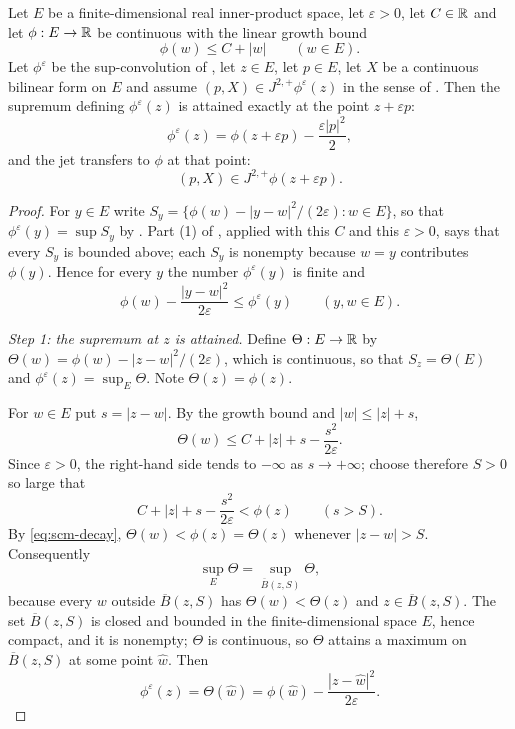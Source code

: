 \begin{lemma}
Let $E$ be a finite-dimensional real inner-product space, let $\varepsilon>0$,
let $C\in\mathbb{R}$ and let $\phi:E\to\mathbb{R}$ be continuous with the linear growth bound
\[
  \phi(w)\le C+|w|\qquad(w\in E).
\]
Let $\phi^\varepsilon$ be the sup-convolution of , let
$z\in E$, let $p\in E$, let $X$ be a continuous bilinear form on $E$ and assume
$(p,X)\in J^{2,+}\phi^\varepsilon(z)$ in the sense of . Then
the supremum defining $\phi^\varepsilon(z)$ is attained exactly at the point
$z+\varepsilon p$:
\[
  \phi^\varepsilon(z)=\phi(z+\varepsilon p)-\frac{\varepsilon|p|^2}{2},
\]
and the jet transfers to $\phi$ at that point:
\[
  (p,X)\in J^{2,+}\phi(z+\varepsilon p).
\]
\end{lemma}
\begin{proof}
For $y\in E$ write
$S_y=\{\phi(w)-|y-w|^2/(2\varepsilon):w\in E\}$, so that
$\phi^\varepsilon(y)=\sup S_y$ by . Part (1) of
, applied with this $C$ and this
$\varepsilon>0$, says that every $S_y$ is bounded above; each $S_y$ is nonempty
because $w=y$ contributes $\phi(y)$. Hence for every $y$ the number
$\phi^\varepsilon(y)$ is finite and
\begin{equation}\label{eq:scm-ub}
  \phi(w)-\frac{|y-w|^2}{2\varepsilon}\le\phi^\varepsilon(y)
  \qquad(y,w\in E).
\end{equation}

\emph{Step 1: the supremum at $z$ is attained.}
Define $\Theta:E\to\mathbb{R}$ by $\Theta(w)=\phi(w)-|z-w|^2/(2\varepsilon)$, which is
continuous, so that $S_z=\Theta(E)$ and $\phi^\varepsilon(z)=\sup_E\Theta$. Note
$\Theta(z)=\phi(z)$.

For $w\in E$ put $s=|z-w|$. By the growth bound and $|w|\le|z|+s$,
\begin{equation}\label{eq:scm-decay}
  \Theta(w)\le C+|z|+s-\frac{s^2}{2\varepsilon}.
\end{equation}
Since $\varepsilon>0$, the right-hand side tends to $-\infty$ as
$s\to+\infty$; choose therefore $S>0$ so large that
\[
  C+|z|+s-\frac{s^2}{2\varepsilon}<\phi(z)\qquad(s>S).
\]
By \eqref{eq:scm-decay}, $\Theta(w)<\phi(z)=\Theta(z)$ whenever $|z-w|>S$.
Consequently
\[
  \sup_E\Theta=\sup_{\overline B(z,S)}\Theta,
\]
because every $w$ outside $\overline B(z,S)$ has $\Theta(w)<\Theta(z)$ and
$z\in\overline B(z,S)$. The set $\overline B(z,S)$ is closed and bounded in the
finite-dimensional space $E$, hence compact, and it is nonempty; $\Theta$ is
continuous, so $\Theta$ attains a maximum on $\overline B(z,S)$ at some point
$\hat w$. Then
\begin{equation}\label{eq:scm-attained}
  \phi^\varepsilon(z)=\Theta(\hat w)
    =\phi(\hat w)-\frac{|z-\hat w|^2}{2\varepsilon}.
\end{equation}


\end{proof}
